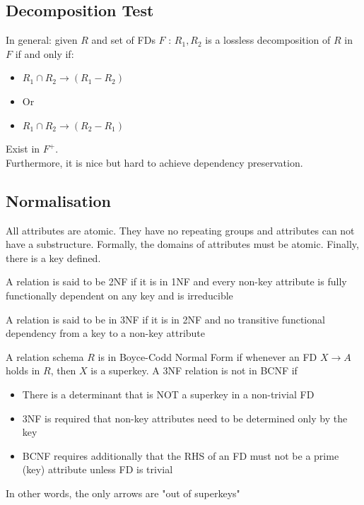 \documentclass[a4paper]{article}
\theoremstyle{plain}
\theoremstyle{definition}
\newtheorem{defn}{Definition}[section]
\theoremstyle{remark}
\begin{document}
\subsection{Decomposition Test}
In general: given $R$ and set of FDs $F$ :
$R_1,R_2$ is a lossless decomposition of $R$ in $F$ if and only if:
\begin{itemize}
	\item $R_1 \cap R_2 \to (R_1-R_2)$ 
	\item Or
	\item $R_1 \cap R_2 \to (R_2-R_1)$
\end{itemize}
Exist in $F^{+}$. \\
Furthermore, it is nice but hard to achieve dependency preservation. 
\subsection{Normalisation}
\begin{tcolorbox}[colback=black!3!white,colframe=black!60!white,title=\begin{defn}First Normal Form \label{First Normal Form}\end{defn}]
All attributes are atomic. They have no repeating groups and attributes can not have a substructure. Formally, the domains of attributes must be atomic. Finally, there is a key defined.
\end{tcolorbox}
\begin{tcolorbox}[colback=black!3!white,colframe=black!60!white,title=\begin{defn}Second Normal Form \label{Second Normal Form}\end{defn}]
A relation is said to be 2NF if it is in 1NF and every non-key attribute is fully functionally dependent on any key and is irreducible
\end{tcolorbox}
\begin{tcolorbox}[colback=black!3!white,colframe=black!60!white,title=\begin{defn}Third Normal Form \label{Third Normal Form}\end{defn}]
A relation is said to be in 3NF if it is in 2NF and no transitive functional dependency from a key to a non-key attribute
\end{tcolorbox}
\begin{tcolorbox}[colback=black!3!white,colframe=black!60!white,title=\begin{defn}Boyce-Codd Normal Form \label{Boyce-Codd Normal Form}\end{defn}]
A relation schema $R$ is in Boyce-Codd Normal Form if whenever an FD $X\to A$ holds in $R$, then $X$ is a superkey. A 3NF relation is not in BCNF if
\begin{itemize}
	\item There is a determinant that is NOT a superkey in a non-trivial FD
	\item 3NF is required that non-key attributes need to be determined only by the key
	\item BCNF requires additionally that the RHS of an FD must not be a prime (key) attribute unless FD is trivial
\end{itemize}
In other words, the only arrows are "out of superkeys"
\end{tcolorbox}
\end{document}
